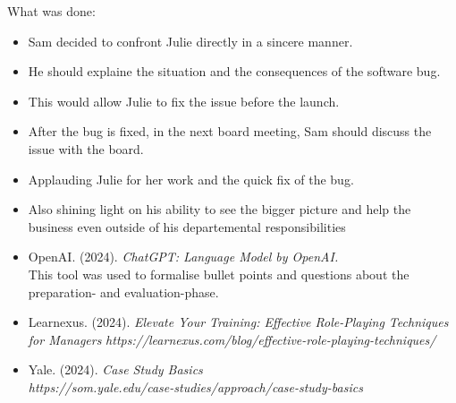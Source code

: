 \documentclass[a4paper,10pt]{article}
\begin{document}
What was done:
\begin{itemize}
    \item Sam decided to confront Julie directly in a sincere manner.
    \item He should explaine the situation and the consequences of the software bug.
    \item This would allow Julie to fix the issue before the launch.
    \item After the bug is fixed, in the next board meeting, Sam should discuss the issue with the board.
    \item Applauding Julie for her work and the quick fix of the bug.
    \item Also shining light on his ability to see the bigger picture and help the business even outside of his departemental responsibilities
\end{itemize}

\begin{itemize}
    \item OpenAI. (2024). \textit{ChatGPT: Language Model by OpenAI.} \\ 
    This tool was used to formalise bullet points and questions about the preparation- and evaluation-phase.
    \item Learnexus. (2024). \textit{Elevate Your Training: Effective Role-Playing Techniques for Managers} \textit{https://learnexus.com/blog/effective-role-playing-techniques/}
    \item Yale. (2024). \textit{Case Study Basics} \\ \textit{https://som.yale.edu/case-studies/approach/case-study-basics}
\end{itemize}
\end{document}
